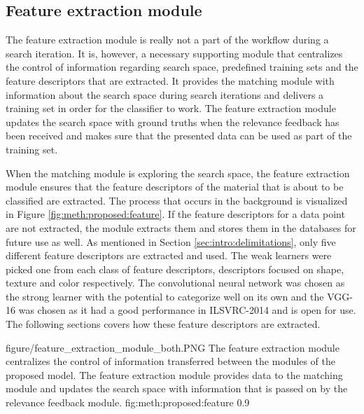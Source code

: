 \subsection{Feature extraction module}
\label{sec:method:proposed:features}
The feature extraction module is really not a part of the workflow during a search iteration. It is, however, a necessary supporting module that centralizes the control of information regarding search space, predefined training sets and the feature descriptors that are extracted. It provides the matching module with information about the search space during search iterations and delivers a training set in order for the classifier to work. The feature extraction module updates the search space with ground truths when the relevance feedback has been received and makes sure that the presented data can be used as part of the training set.

When the matching module is exploring the search space, the feature extraction module ensures that the feature descriptors of the material that is about to be classified are extracted. The process that occurs in the background is visualized in Figure \ref{fig:meth:proposed:feature}. If the feature descriptors for a data point are not extracted, the module extracts them and stores them in the databases for future use as well. As mentioned in Section \ref{sec:intro:delimitations}, only five different feature descriptors are extracted and used. The weak learners were picked one from each class of feature descriptors, descriptors focused on shape, texture and color respectively. The convolutional neural network was chosen as the strong learner with the potential to categorize well on its own and the VGG-16 was chosen as it had a good performance in ILSVRC-2014 and is open for use. The following sections covers how these feature descriptors are extracted. 


\singlefigure
{figure/feature_extraction_module_both.PNG}
{The feature extraction module centralizes the control of information transferred between the modules of the proposed model. The feature extraction module provides data to the matching module and updates the search space with information that is passed on by the relevance feedback module.}
{fig:meth:proposed:feature}
{0.9}





